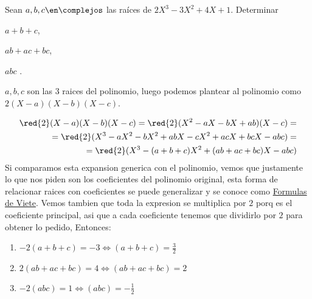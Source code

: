 \begin{enunciado}{\ejercicio}
  Sean $a, b, c \en \complejos$ las raíces de $2X^3 - 3X^2 + 4X + 1$. Determinar
  \begin{enumerate}[label=\roman*)]
    \begin{multicols}{3}
      \item $a + b + c$,
      \item $ab + ac + bc$,
      \item $abc$ .
    \end{multicols}
  \end{enumerate}
\end{enunciado}

$a, b, c$ son las 3 raices del polinomio, luego podemos plantear al polinomio como 
$2(X-a)(X-b)(X-c)$. 

\begin{align*}
\red{2}(X-a)(X-b)(X-c) = \red{2}(X^2 - aX - bX + ab)(X - c) = \\
= \red{2}(X^3 - aX^2 - bX^2 + abX -cX^2 +acX +bcX - abc) = \\
= \red{2}(X^3 -(a + b + c)X^2 + (ab + ac + bc)X - abc)
\end{align*}
Si comparamos esta expansion generica con el polinomio, vemos que justamente lo que nos piden son los coeficientes
del polinomio original, esta forma de relacionar raices con coeficientes se puede generalizar y se conoce como \href{https://en.wikipedia.org/wiki/Vieta\%27s_formulas}{Formulas de Viete}. 
Vemos tambien que toda la expresion se multiplica por $2$ porq es el coeficiente principal, asi que a cada coeficiente tenemos que dividirlo por $2$
para obtener lo pedido, Entonces:
\begin{enumerate}[label=\roman*)]
  \item $-2(a+b+c) = -3 \iff (a+b+c) = \frac{3}{2}$
  \item $2(ab + ac + bc) = 4 \iff (ab + ac + bc) = 2$
  \item $-2(abc) = 1 \iff (abc) = -\frac{1}{2}$

\end{enumerate}

\begin{aportes}
 \item {}
\end{aportes}

